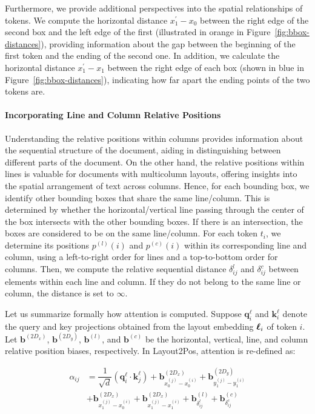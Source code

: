Furthermore, we provide additional perspectives into the spatial relationships of tokens. We compute the horizontal distance $x^{\prime}_1 - x_0$ between the right edge of the second box and the left edge of the first (illustrated in orange in Figure~\ref{fig:bbox-distances}), providing information about the gap between the beginning of the first token and the ending of the second one. In addition, we calculate the horizontal distance $x^{\prime}_1 - x_1$ between the right edge of each box (shown in blue in Figure~\ref{fig:bbox-distances}), indicating how far apart the ending points of the two tokens are.


\paragraph{Incorporating Line and Column Relative Positions}

Understanding the relative positions within columns provides information about the sequential structure of the document, aiding in distinguishing between different parts of the document. On the other hand, the relative positions within lines is valuable for documents with multicolumn layouts, offering insights into the spatial arrangement of text across columns. Hence, for each bounding box, we identify other bounding boxes that share the same line/column. This is determined by whether the horizontal/vertical line passing through the center of the box intersects with the other bounding boxes. If there is an intersection, the boxes are considered to be on the same line/column. For each token $t_i$, we determine its positions $p^{(l)}(i)$ and $p^{(c)}(i)$ within its corresponding line and column, using a left-to-right order for lines and a top-to-bottom order for columns. Then, we compute the relative sequential distance $\delta^{l}_{ij}$ and $\delta^{c}_{ij}$ between elements within each line and column. If they do not belong to the same line or column, the distance is set to $\infty$. 

Let us summarize formally how attention is computed. Suppose $\bm{q}^{\ell}_i$ and $\bm{k}^{\ell}_i$ denote the query and key projections obtained from the layout embedding $\boldsymbol{\ell}_i$ of token $i$. Let $\bm{b}^{(2D_x)}$, $\bm{b}^{(2D_y)}$, $\bm{b}^{(l)}$, and $\bm{b}^{(c)}$ be the horizontal, vertical, line, and column relative position biases, respectively. In Layout2Pos, attention is re-defined as:

\begin{equation}
  \begin{split}
  \alpha_{ij} &= \dfrac{1}{\sqrt{d}} \left(\bm{q}^{\ell}_i \cdot \bm{k}^{\ell}_j\right)
              + \bm{b}^{(2D_x)}_{x^{(j)}_{0} - x^{(i)}_{0}} + \bm{b}^{(2D_y)}_{y^{(j)}_{1} - y^{(i)}_{1}} \\
              & + \bm{b}^{(2D_x)}_{x^{(j)}_{1} - x^{(i)}_{0}} + \bm{b}^{(2D_x)}_{x^{(j)}_{1} - x^{(i)}_{1}} 
               + \bm{b}^{(l)}_{\delta^{l}_{ij}}  + \bm{b}^{(c)}_{\delta^{c}_{ij}}
  \end{split}
\label{eq:layout2pos-attention}
\end{equation}

